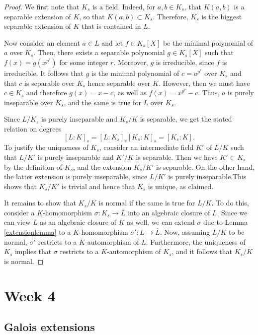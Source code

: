 \documentclass[12pt]{report}
\theoremstyle{definition}
\begin{document}
\begin{proof}
    We first note that $K_s$ is a field. Indeed, for $a, b\in K_s$, that $K(a, b)$ is a separable extension of $K$, so that $K(a, b) \subset K_s$. Therefore, $K_s$ is the biggest separable extension of $K$ that is contained in $L$.
    
    Now consider an element $a\in L$ and let $f\in K_s[X]$ be the minimal polynomial of $a$ over $K_s$. Then, there exists a separable polynomial $g\in K_s[X]$ such that $f(x) = g(x^{p^r})$ for some integer $r$. Moreover, $g$ is irreducible, since $f$ is irreducible. It follows that $g$ is the minimal polynomial of $c = a^{p^r}$ over $K_s$ and that $c$ is separable over $K_s$ hence separable over $K$. However, then we must have $c\in K_s$ and therefore $g(x) = x - c$, as well as $f(x) = x^{p^r} - c$. Thus, $a$ is purely inseparable over $K_s$, and the same is true for $L$ over $K_s$.


    Since $L/K_s$ is purely inseparable and $K_s/K$ is separable, we get the stated relation on degrees $$[L:K]_s=[L:K_s]_s[K_s:K]_s=[K_s:K].$$
    To justify the uniqueness of $K_s$, consider an intermediate field $K'$ of $L/K$ such that $L/K'$ is purely inseparable and $K'/K$ is separable. Then we have $K' \subset K_s$ by the definition of $K_s$, and the extension $K_s/K'$ is separable. On the other hand, the latter extension is purely inseparable, since $L/K'$ is purely inseparable.This shows that $K_s/K'$ is trivial and hence that $K_s$ is unique, as claimed.


    It remains to show that $K_s/K$ is normal if the same is true for $L/K$. To do this, consider a $K$-homomorphism $\sigma : K_s\to \overline{L}$ into an algebraic closure of $L$. Since we can view $\overline{L}$ as an algebraic closure of $K$ as well, we can extend $\sigma$ due to Lemma \ref{extensionlemma} to a $K$-homomorphism $\sigma' : L\to \overline{L}$. Now, assuming $L/K$ to be normal, $\sigma'$ restricts to a $K$-automorphism of $L$. Furthermore, the uniqueness of $K_s$ implies that $\sigma$ restricts to a $K$-automorphism of $K_s$, and it follows that $K_s/K$ is normal.
\end{proof}

\chapter*{Week 4}
\setcounter{chapter}{4}

\section{Galois extensions}
\end{document}
